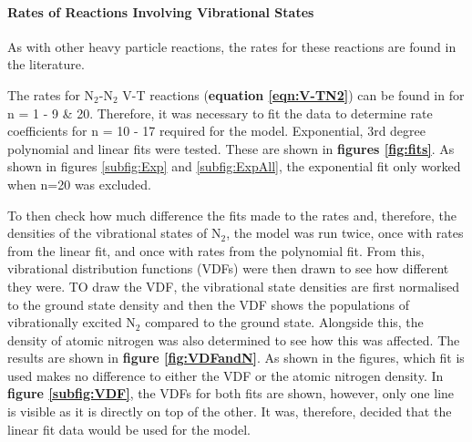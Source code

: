 \documentclass[11pt, oneside]{article}   	%
\begin{document}
\paragraph{Rates of Reactions Involving Vibrational States}

As with other heavy particle reactions, the rates for these reactions are found in the literature.


The rates for N$_2$-N$_2$ V-T reactions (\textbf{equation \ref{eqn:V-TN2}}) can be found in  \cite{Billing1979vv} for n = 1 - 9 \& 20.
Therefore, it was necessary to fit the data to determine rate coefficients for n = 10 - 17 required for the model.
Exponential, 3rd degree polynomial and linear fits were tested.
These are shown in \textbf{figures \ref{fig:fits}}.
As shown in figures \ref{subfig:Exp} and \ref{subfig:ExpAll}, the exponential fit only worked when n=20 was excluded.

To then check how much difference the fits made to the rates and, therefore, the densities of the vibrational states of N$_2$, the model was run twice, once with rates from the linear fit, and once with rates from the polynomial fit.
From this, vibrational distribution functions (VDFs) were then drawn to see how different they were.
TO draw the VDF, the vibrational state densities are first normalised to the ground state density and then the VDF shows the populations of vibrationally excited N$_2$ compared to the ground state.
Alongside this, the density of atomic nitrogen was also determined to see how this was affected.
The results are shown in \textbf{figure \ref{fig:VDFandN}}.
As shown in the figures, which fit is used makes no difference to either the VDF or the atomic nitrogen density.
In \textbf{figure \ref{subfig:VDF}}, the VDFs for both fits are shown, however, only one line is visible as it is directly on top of the other.
It was, therefore, decided that the linear fit data would be used for the model.



\end{document}
